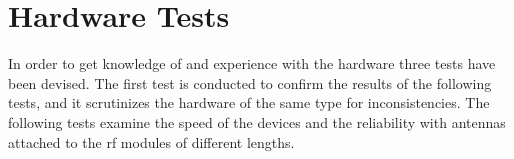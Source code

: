 \section{Hardware Tests} %
\label{sec:hardware_tests}
In order to get knowledge of and experience with the hardware three tests have been devised.
The first test is conducted to confirm the results of the following tests, and it scrutinizes the hardware of the same type for inconsistencies.
The following tests examine the speed of the devices and the reliability with antennas attached to the \gls{rf} modules of different lengths.

% 
% 
